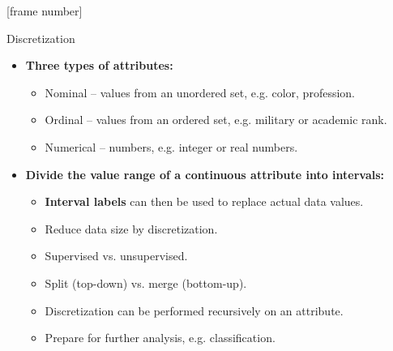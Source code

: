 \documentclass[aspectratio=169,t]{beamer}
\begin{document}
  {
    [frame number]
    \begin{frame}{Discretization}
    \begin{itemize}
      \item \textbf{Three types of attributes:}
      \begin{itemize}
        \item Nominal -- values from an unordered set, e.g. color, profession.
        \item Ordinal -- values from an ordered set, e.g. military or academic rank.
        \item Numerical -- numbers, e.g. integer or real numbers.
      \end{itemize}
      \item \textbf{Divide the value range of a continuous attribute into intervals:}
      \begin{itemize}
        \item \textbf{Interval labels} can then be used to replace actual data values.
        \item Reduce data size by discretization.
        \item Supervised vs. unsupervised.
        \item Split (top-down) vs. merge (bottom-up).
        \item Discretization can be performed recursively on an attribute.
        \item Prepare for further analysis, e.g. classification.
      \end{itemize}
    \end{itemize}
    \end{frame}
  }
\end{document}
